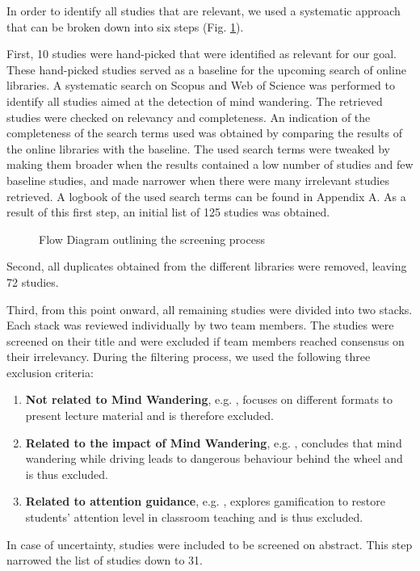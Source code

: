In order to identify all studies that are relevant, we used a systematic approach that can be broken down into six steps (Fig. \ref{fig:prisma}).

First, 10 studies were hand-picked that were identified as relevant for our goal. These hand-picked studies served as a baseline for the upcoming search of online libraries.
A systematic search on Scopus and Web of Science was performed to identify all studies aimed at the detection of mind wandering. The retrieved studies were checked on relevancy and completeness.
An indication of the completeness of the search terms used was obtained by comparing the results of the online libraries with the baseline. 
The used search terms were tweaked by making them broader when the results contained a low number of studies and few baseline studies, and made narrower when there were many irrelevant studies retrieved.
A logbook of the used search terms can be found in Appendix A.
As a result of this first step, an initial list of 125 studies was obtained.

\begin{figure}
  \resizebox{\columnwidth}{!}{}
\caption{Flow Diagram outlining the screening process}
\label{fig:prisma}
\end{figure}

Second, all duplicates obtained from the different libraries were removed, leaving 72 studies.

Third, from this point onward, all remaining studies were divided into two stacks. Each stack was reviewed individually by two team members.
The studies were screened on their title and were excluded if team members reached consensus on their irrelevancy. 
During the filtering process, we used the following three exclusion criteria:
\begin{enumerate}
  \item \textbf{Not related to Mind Wandering}, e.g. \cite{ISI:000432512400017}, focuses on different formats to present lecture material and is therefore excluded.
  \item \textbf{Related to the impact of Mind Wandering}, e.g. \cite{Albert2018LinkingDrivers}, concludes that mind wandering while driving leads to dangerous behaviour behind the wheel and is thus excluded.
  \item \textbf{Related to attention guidance}, e.g. \cite{Xiao2018ClassroomMechanism}, explores gamification to restore students' attention level in classroom teaching and is thus excluded.  \end{enumerate}
In case of uncertainty, studies were included to be screened on abstract. This step narrowed the list of studies down to 31.

